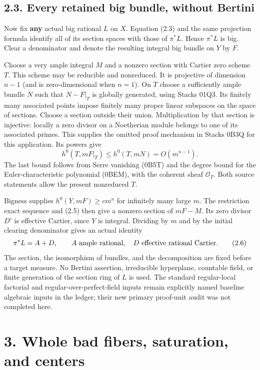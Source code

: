 \documentclass[
  10pt,
]{article}
\begin{document}
\subsection{2.3. Every retained big bundle, without
Bertini}\label{every-retained-big-bundle-without-bertini}

Now fix \textbf{any} actual big rational \(L\) on \(X\). Equation (2.3)
and the same projection formula identify all of its section spaces with
those of \(\pi^*L\). Hence \(\pi^*L\) is big. Clear a denominator and
denote the resulting integral big bundle on \(Y\) by \(F\).

Choose a very ample integral \(M\) and a nonzero section with Cartier
zero scheme \(T\). This scheme may be reducible and nonreduced. It is
projective of dimension \(n-1\) (and is zero-dimensional when \(n=1\)).
On \(T\) choose a sufficiently ample bundle \(N\) such that \(N-F|_T\)
is globally generated, using Stacks 01Q3. Its finitely many associated
points impose finitely many proper linear subspaces on the space of
sections. Choose a section outside their union. Multiplication by that
section is injective: locally a zero divisor on a Noetherian module
belongs to one of its associated primes. This supplies the omitted proof
mechanism in Stacks 0B3Q for this application. Its powers give \[
 h^0(T,mF|_T)\leq h^0(T,mN)=O(m^{n-1}).
 \tag{2.5}
\] The last bound follows from Serre vanishing (0B5T) and the degree
bound for the Euler-characteristic polynomial (0BEM), with the coherent
sheaf \(\mathcal O_T\). Both source statements allow the present
nonreduced \(T\).

Bigness supplies \(h^0(Y,mF)\geq c m^n\) for infinitely many large
\(m\). The restriction exact sequence and (2.5) then give a nonzero
section of \(mF-M\). Its zero divisor \(D'\) is effective Cartier, since
\(Y\) is integral. Dividing by \(m\) and by the initial clearing
denominator gives an actual identity \[
 \pi^*L=A+D,\qquad A\ \hbox{ample rational},\quad D\ \hbox{effective rational Cartier}.
 \tag{2.6}
\] The section, the isomorphism of bundles, and the decomposition are
fixed before a target measure. No Bertini assertion, irreducible
hyperplane, countable field, or finite generation of the section ring of
\(L\) is used. The standard regular-local factorial and
regular-over-perfect-field inputs remain explicitly named baseline
algebraic inputs in the ledger; their new primary proof-unit audit was
not completed here.

\section{3. Whole bad fibers, saturation, and
centers}\label{whole-bad-fibers-saturation-and-centers}
\end{document}
